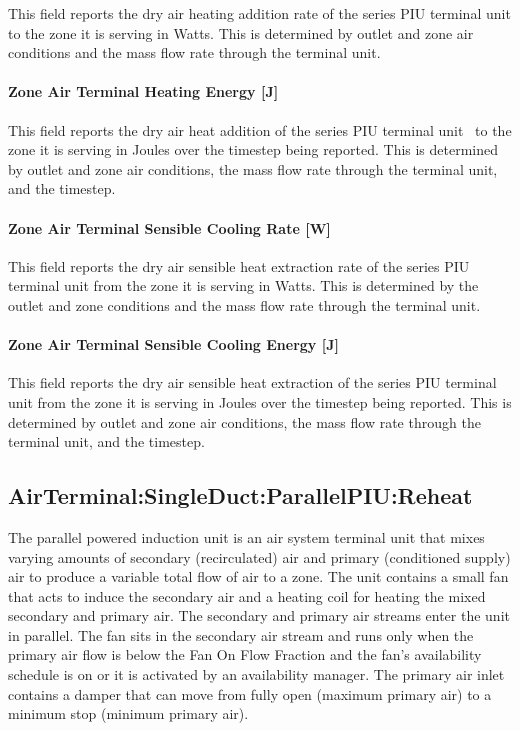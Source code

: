 This field reports the dry air heating addition rate of the series PIU terminal unit to the zone it is serving in Watts. This is determined by outlet and zone air conditions and the mass flow rate through the terminal unit.

\paragraph{Zone Air Terminal Heating Energy {[}J{]}}\label{zone-air-terminal-heating-energy-j}

This field reports the dry air heat addition of the series PIU terminal unit~ to the zone it is serving in Joules over the timestep being reported. This is determined by outlet and zone air conditions, the mass flow rate through the terminal unit, and the timestep.

\paragraph{Zone Air Terminal Sensible Cooling Rate {[}W{]}}\label{zone-air-terminal-sensible-cooling-rate-w-1}

This field reports the dry air sensible heat extraction rate of the series PIU terminal unit from the zone it is serving in Watts. This is determined by the outlet and zone conditions and the mass flow rate through the terminal unit.

\paragraph{Zone Air Terminal Sensible Cooling Energy {[}J{]}}\label{zone-air-terminal-sensible-cooling-energy-j-1}

This field reports the dry air sensible heat extraction of the series PIU terminal unit from the zone it is serving in Joules over the timestep being reported. This is determined by outlet and zone air conditions, the mass flow rate through the terminal unit, and the timestep.

\subsection{AirTerminal:SingleDuct:ParallelPIU:Reheat}\label{airterminalsingleductparallelpiureheat}

The parallel powered induction unit is an air system terminal unit that mixes varying amounts of secondary (recirculated) air and primary (conditioned supply) air to produce a variable total flow of air to a zone. The unit contains a small fan that acts to induce the secondary air and a heating coil for heating the mixed secondary and primary air. The secondary and primary air streams enter the unit in parallel. The fan sits in the secondary air stream and runs only when the primary air flow is below the Fan On Flow Fraction and the fan's availability schedule is on or it is activated by an availability manager. The primary air inlet contains a damper that can move from fully open (maximum primary air) to a minimum stop (minimum primary air).

